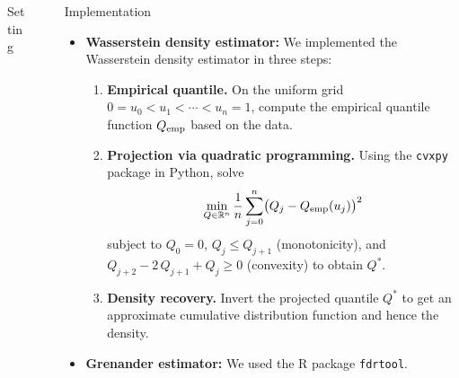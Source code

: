\documentclass[final]{beamer}
\newlength{\sepwidth}
\newlength{\colwidth}
\newcommand{\separatorcolumn}{\begin{column}{\sepwidth}\end{column}}
\begin{document}
\begin{frame}[t]
\begin{columns}[t]
\begin{column}{\colwidth}
\begin{block}{Setting}

\end{block}



\end{column}

\separatorcolumn

\begin{column}{\colwidth}
\begin{alertblock}{Implementation}
    \begin{itemize}
        \item \textbf{Wasserstein density estimator:} We implemented the Wasserstein density estimator in three steps:
\begin{enumerate}
  \item \textbf{Empirical quantile.} On the uniform grid
    $0 = u_0 < u_1 < \cdots < u_n = 1$, compute the empirical quantile function $Q_{\rm emp}$ based on the data.
  \item \textbf{Projection via quadratic programming.} Using the \texttt{cvxpy} package in Python, solve
    \[
      \min_{Q\in\mathbb{R}^n}
        \frac{1}{n}\sum_{j=0}^n \bigl(Q_j - Q_{\rm emp}(u_j)\bigr)^2
    \]
    subject to $Q_0 = 0$, $Q_j \leq Q_{j+1}$ (monotonicity), and $Q_{j+2} - 2\,Q_{j+1} + Q_j \ge 0$ (convexity) to obtain \(Q^*\).
  \item \textbf{Density recovery.} Invert the projected quantile
    \(Q^*\) to get an approximate cumulative distribution function and hence the density.
\end{enumerate}
\item \textbf{Grenander estimator:} We used the R package \texttt{fdrtool}.


\end{itemize}
\end{alertblock}
\end{column}
\end{columns}
\end{frame}
\end{document}
